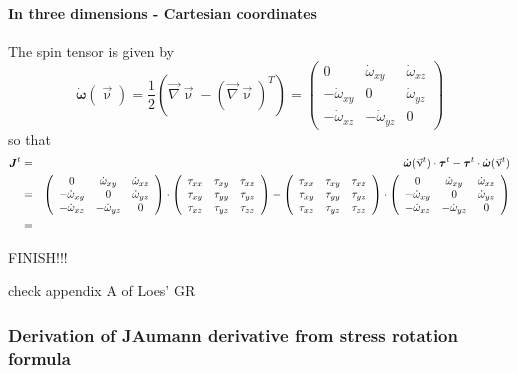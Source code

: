 \paragraph{In three dimensions - Cartesian coordinates}
The spin tensor is given by 
\[
\dot{\bm \omega}(\vec\upnu) 
= \frac{1}{2}\left( \vec\nabla\vec \upnu - (\vec\nabla \vec\upnu)^T \right)
= 
\left( \begin{array}{ccc}
0 & \dot{\omega}_{xy} & \dot{\omega}_{xz}\\
-\dot{\omega}_{xy} & 0 & \dot{\omega}_{yz} \\
-\dot{\omega}_{xz} & -\dot{\omega}_{yz} & 0
\end{array}\right)
\]
so that 
\begin{eqnarray}
{\bm J}^t 
&=& \dot{\bm \omega}(\vec\upnu^t) \cdot {\bm \tau}^t - {\bm \tau}^t \cdot \dot{\bm \omega}(\vec\upnu^t)  \nonumber\\
&=&
\left( \begin{array}{ccc}
0 & \dot{\omega}_{xy} & \dot{\omega}_{xz}\\
-\dot{\omega}_{xy} & 0 & \dot{\omega}_{yz} \\
-\dot{\omega}_{xz} & -\dot{\omega}_{yz} & 0
\end{array}\right)
\cdot
\left( \begin{array}{ccc}
\tau_{xx} & \tau_{xy} & \tau_{xz}\\
\tau_{xy} & \tau_{yy} & \tau_{yz}\\
\tau_{xz} & \tau_{yz} & \tau_{zz}
\end{array}\right)
-
\left( \begin{array}{ccc}
\tau_{xx} & \tau_{xy} & \tau_{xz}\\
\tau_{xy} & \tau_{yy} & \tau_{yz}\\
\tau_{xz} & \tau_{yz} & \tau_{zz}
\end{array}\right)
\cdot
\left( \begin{array}{ccc}
0 & \dot{\omega}_{xy} & \dot{\omega}_{xz}\\
-\dot{\omega}_{xy} & 0 & \dot{\omega}_{yz} \\
-\dot{\omega}_{xz} & -\dot{\omega}_{yz} & 0
\end{array}\right)
\nonumber\\
&=&
\end{eqnarray}

FINISH!!!


check appendix A of Loes' GR

\newpage
\subsubsection{Derivation of JAumann derivative from stress rotation formula}

